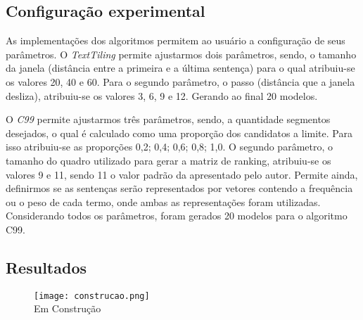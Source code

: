 \subsection{Configuração experimental}
	\label{subsec:configuracaoexperimental}

As implementações dos algoritmos permitem ao usuário a configuração de seus parâmetros. 
%
O \textit{TextTiling} permite ajustarmos dois parâmetros, sendo, o tamanho da janela (distância entre a primeira e a última sentença) para o qual atribuiu-se os valores 20, 40 e 60. Para o segundo parâmetro, o passo (distância que a janela desliza), atribuiu-se os valores 3, 6, 9 e 12. Gerando ao final 20 modelos.
%

O \textit{C99} permite ajustarmos três parâmetros, sendo, a quantidade segmentos desejados, o qual é calculado como uma proporção dos candidatos a limite. Para isso atribuiu-se as proporções {0,2; 0,4; 0,6; 0,8; 1,0}. O segundo parâmetro, o tamanho do quadro utilizado para gerar a matriz de ranking, atribuiu-se os valores 9 e 11, sendo 11 o valor padrão da apresentado pelo autor. Permite ainda, definirmos se as sentenças serão representados por vetores contendo a frequência ou o peso de cada termo, onde ambas as representações foram utilizadas.
%
 Considerando todos os parâmetros, foram gerados 20 modelos para o algoritmo C99.%


\subsection{Resultados}
	\label{subsec:resultados}
	
	
  \begin{figure}[!h]
	\centering
	\texttt{[image: construcao.png]}
	\\Em Construção
	\label{fig:emconstrucao}
  \end{figure}

	


%
%

